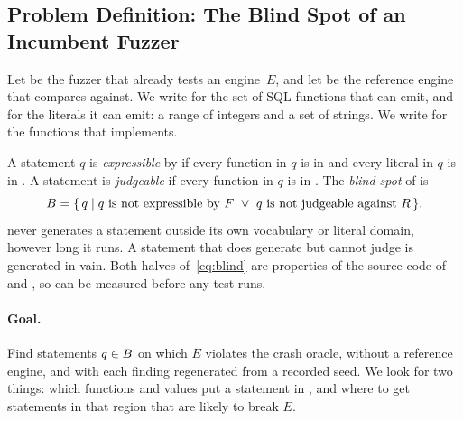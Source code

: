 \subsection{Problem Definition: The Blind Spot of an Incumbent Fuzzer}
\label{sec:problem}

Let \Fz be the fuzzer that already tests an engine~$E$, and let \Rengine be the
reference engine that \Fz compares against. We write \Voc for the set of SQL
functions that \Fz can emit, and \Lit for the literals it can emit: a range of
integers and a set of strings. We write \VocR for the functions that \Rengine
implements.

A statement $q$ is \emph{expressible} by \Fz if every function in $q$ is in \Voc
and every literal in $q$ is in \Lit. A statement is \emph{judgeable} if every
function in $q$ is in \VocR. The \emph{blind spot} of \Fz is
\begin{equation}
  \label{eq:blind}
  B = \{\, q \mid q \text{ is not expressible by } F
           \ \lor\ q \text{ is not judgeable against } R \,\}.
\end{equation}
\Fz never generates a statement outside its own vocabulary or literal domain,
however long it runs. A statement that \Fz does generate but cannot judge is
generated in vain. Both halves of~\eqref{eq:blind} are properties of the source
code of \Fz and \Rengine, so \Blind can be measured before any test runs.

\paragraph{Goal.} Find statements $q \in B$ on which $E$ violates the crash
oracle, without a reference engine, and with each finding regenerated from a
recorded seed. We look for two things: which functions and values put a
statement in \Blind, and where to get statements in that region that are likely
to break $E$.
